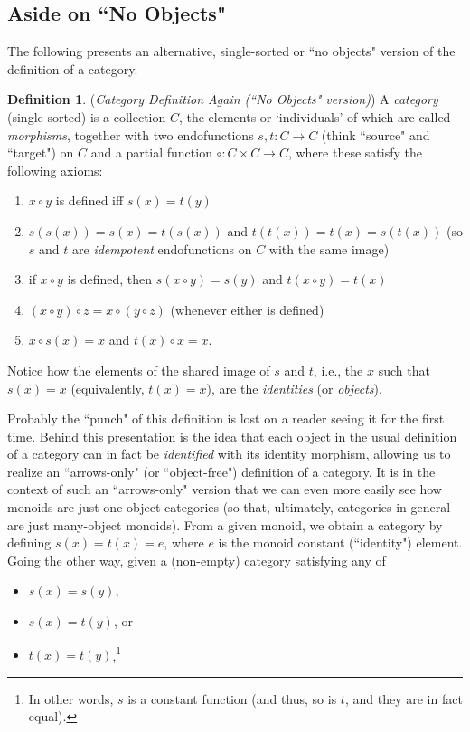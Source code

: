 \documentclass[a4paper]{book}
\theoremstyle{definition}
\theoremstyle{definition}
\newtheorem{definition}{Definition}[section]
\theoremstyle{definition}
\theoremstyle{theorem}
\theoremstyle{definition}
\begin{document}
\subsection{Aside on ``No Objects"}
\label{sec: No Objects}
The following presents an alternative, single-sorted or ``no objects" version of the definition of a category.
\begin{definition}
	 (\textit{Category Definition Again (``No Objects" version)}) A \textit{category} (single-sorted)  is a collection $C$, the elements or `individuals' of which are called \textit{morphisms}, together with two endofunctions $s, t: C \rightarrow C$ (think ``source" and ``target") on $C$ and a partial function $\circ: C \times C \rightarrow C$, where these satisfy the following axioms: 
	\begin{enumerate}
		\item $x \circ y$ is defined iff $s(x) = t(y)$
		\item $s(s(x)) = s(x) = t(s(x))$ and $t(t(x)) = t(x) = s(t(x))$ (so $s$ and $t$ are \textit{idempotent} endofunctions on $C$ with the same image)
		\item if $x \circ y$ is defined, then $s(x \circ y) = s(y)$ and $t(x \circ y) = t(x)$
		\item $(x \circ y) \circ z = x \circ (y \circ z)$ (whenever either is defined)
		\item $x \circ s(x) = x$ and $t(x) \circ x = x$. 
	\end{enumerate}
\end{definition}
Notice how the elements of the shared image of $s$ and $t$, i.e., the $x$ such that $s(x) = x$ (equivalently, $t(x) = x$), are the \textit{identities} (or \textit{objects}). \par 
Probably the ``punch" of this definition is lost on a reader seeing it for the first time. Behind this presentation is the idea that each object in the usual definition of a category can in fact be \textit{identified} with its identity morphism, allowing us to realize an ``arrows-only" (or ``object-free") definition of a category. It is in the context of such an ``arrows-only" version that we can even more easily see how monoids are just one-object categories (so that, ultimately, categories in general are just many-object monoids). From a given monoid, we obtain a category by defining $s(x) = t(x) = e$, where $e$ is the monoid constant (``identity") element. Going the other way, given a (non-empty) category satisfying any of 
\begin{itemize}
	\item $s(x) = s(y)$,
	\item $s(x) = t(y)$, or 
	\item $t(x) = t(y)$,\footnote{In other words, $s$ is a constant function (and thus, so is $t$, and they are in fact equal).}
\end{itemize} 
\end{document}
